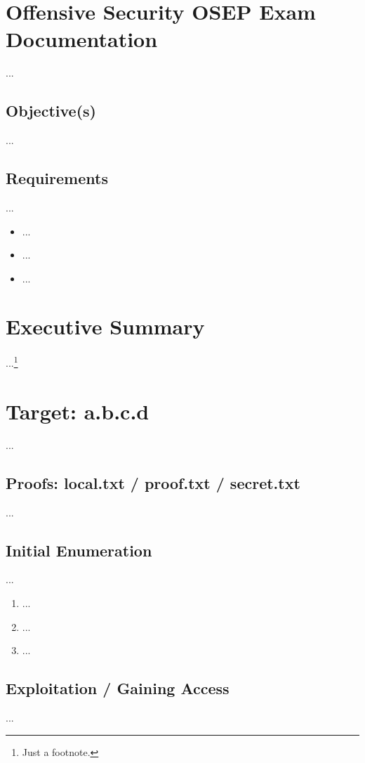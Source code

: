 %
%
%
\section{Offensive Security OSEP Exam Documentation}\label{osep-sec:sec1}
%
...~\cite{MitreAttack}
%
%
%
\subsection{Objective(s)}\label{osep-sec:sec1-obj}
%
...
%
%
%
%
\subsection{Requirements}\label{osep-sec:sec1-req}
%
...

\begin{itemize}
    \item ...
    \item ...
    \item ...
\end{itemize}
%
%
%
\section{Executive Summary}\label{osep-sec:sec2}
%
...\footnote{Just a footnote.}
%
%
%
\section{Target: a.b.c.d}\label{osep-sec:sec3}
%
...
%
%
%
\subsection{Proofs: local.txt / proof.txt / secret.txt}\label{osep-sec:sec3-proofs}
%
...
%
%
%
\subsection{Initial Enumeration}\label{osep-sec:sec3-enum1}
%
...

\begin{enumerate}
    \item ...
    \item ...
    \item ...
\end{enumerate}
%
%
%
\subsection{Exploitation / Gaining Access}\label{osep-sec:sec3-gain}
%
...

